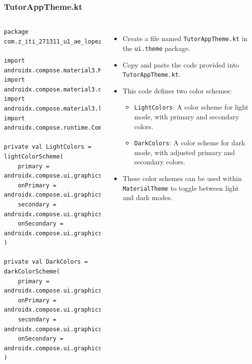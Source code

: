 \documentclass[pdf,
serif,
compress,
xcolor=table,
dvipsnames,
spanish,
aspectratio=169]{beamer}
\begin{document}

\begin{frame}[fragile]
    \frametitle{TutorAppTheme.kt}
\begin{columns}
\begin{verbatim}
package com.z_iti_271311_u1_ae_lopez_leal_antonio_isai.ui.theme

import androidx.compose.material3.MaterialTheme
import androidx.compose.material3.darkColorScheme
import androidx.compose.material3.lightColorScheme
import androidx.compose.runtime.Composable

private val LightColors = lightColorScheme(
    primary = androidx.compose.ui.graphics.Color(0xFF6200EE),
    onPrimary = androidx.compose.ui.graphics.Color.White,
    secondary = androidx.compose.ui.graphics.Color(0xFF03DAC6),
    onSecondary = androidx.compose.ui.graphics.Color.Black
)

private val DarkColors = darkColorScheme(
    primary = androidx.compose.ui.graphics.Color(0xFFBB86FC),
    onPrimary = androidx.compose.ui.graphics.Color.Black,
    secondary = androidx.compose.ui.graphics.Color(0xFF03DAC6),
    onSecondary = androidx.compose.ui.graphics.Color.Black
)
\end{verbatim}

\begin{itemize}\tiny
    \item Create a file named \texttt{TutorAppTheme.kt} in the \texttt{ui.theme} package.
    \item Copy and paste the code provided into \texttt{TutorAppTheme.kt}.
    \item This code defines two color schemes:
    \begin{itemize}\tiny
        \item \texttt{LightColors}: A color scheme for light mode, with primary and secondary colors.
        \item \texttt{DarkColors}: A color scheme for dark mode, with adjusted primary and secondary colors.
    \end{itemize}
    \item These color schemes can be used within \texttt{MaterialTheme} to toggle between light and dark modes.
\end{itemize}


\end{columns}
\end{frame}
\end{document}
